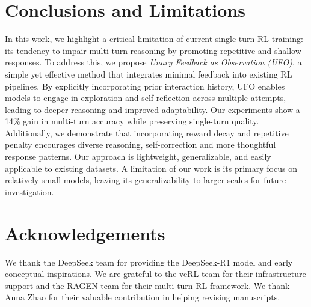 \vspace{-5pt}
\section{Conclusions and Limitations}

\label{sec:conclusions}

In this work, we highlight a critical limitation of current single-turn RL training: its tendency to impair multi-turn reasoning by promoting repetitive and shallow responses. To address this, we propose \textit{Unary Feedback as Observation (UFO)}, a simple yet effective method that integrates minimal feedback into existing RL pipelines. By explicitly incorporating prior interaction history, UFO enables models to engage in exploration and self-reflection across multiple attempts, leading to deeper reasoning and improved adaptability. Our experiments show a 14\% gain in multi-turn accuracy while preserving single-turn quality. Additionally, we demonstrate that incorporating reward decay and repetitive penalty encourages diverse reasoning, self-correction and more thoughtful response patterns. Our approach is lightweight, generalizable, and easily applicable to existing datasets. A limitation of our work is its primary focus on relatively small models, leaving its generalizability to larger scales for future investigation. 

\section{Acknowledgements}
We thank the DeepSeek team for providing the DeepSeek-R1 model and early conceptual inspirations. We are grateful to the veRL team for their infrastructure support and the RAGEN team for their multi-turn RL framework. We thank Anna Zhao for their valuable contribution in helping revising manuscripts.